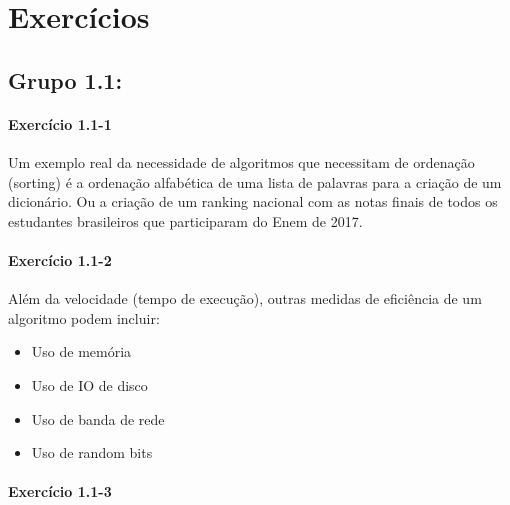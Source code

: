 \documentclass[pdftex,a4paper,12pt,brazil]{article} %
\begin{document}
\section{Exercícios} 
\label{exercicios}


\subsection{Grupo 1.1:}
\label{grupo_1_1}

\paragraph{Exercício 1.1-1}

Um exemplo real da necessidade de algoritmos que necessitam de ordenação
(sorting) é a ordenação alfabética de uma lista de palavras para a criação de um dicionário. Ou
a criação de um ranking nacional com as notas finais de todos os estudantes brasileiros que
participaram do Enem de 2017.

\paragraph{Exercício 1.1-2}

Além da velocidade (tempo de execução), outras medidas de eficiência de
um algoritmo podem incluir:

\begin{itemize}
\item Uso de memória
\item Uso de IO de disco
\item Uso de banda de rede
\item Uso de random bits
\end{itemize}

\paragraph{Exercício 1.1-3}
\end{document}
